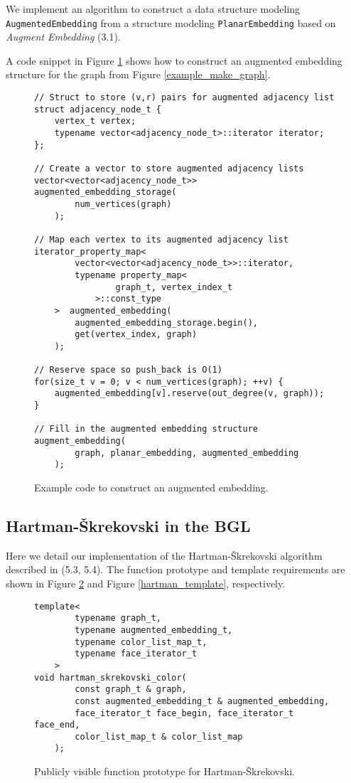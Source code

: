 \documentclass[letterpaper, 12pt]{article}
\theoremstyle{thm}
\begin{document}
We implement an algorithm to construct a data structure modeling
\texttt{Augmented{\allowbreak}Embedding}
from a structure modeling \texttt{PlanarEmbedding} based on \textit{Augment
Embedding} (3.1).

A code snippet in Figure \ref{example_augment_embedding} shows how to
construct an augmented embedding structure for the graph from Figure
\ref{example_make_graph}.

\begin{figure}
\begin{lstlisting}[frame=single]
// Struct to store (v,r) pairs for augmented adjacency list
struct adjacency_node_t {
    vertex_t vertex;
    typename vector<adjacency_node_t>::iterator iterator;
};

// Create a vector to store augmented adjacency lists
vector<vector<adjacency_node_t>> augmented_embedding_storage(
        num_vertices(graph)
    );

// Map each vertex to its augmented adjacency list
iterator_property_map<
        vector<vector<adjacency_node_t>>::iterator,
        typename property_map<
                graph_t, vertex_index_t
            >::const_type
    >  augmented_embedding(
        augmented_embedding_storage.begin(),
        get(vertex_index, graph)
    );

// Reserve space so push_back is O(1)
for(size_t v = 0; v < num_vertices(graph); ++v) {
    augmented_embedding[v].reserve(out_degree(v, graph));
}

// Fill in the augmented embedding structure
augment_embedding(
        graph, planar_embedding, augmented_embedding
    );
\end{lstlisting}
\caption{Example code to construct an augmented embedding.}
\label{example_augment_embedding}
\end{figure}

\subsection{Hartman-\v{S}krekovski in the BGL}

Here we detail our implementation of the Hartman-\v{S}krekovski algorithm described
in (5.3, 5.4). The
function prototype and template requirements are shown
in Figure \ref{hartman_prototype} and Figure \ref{hartman_template},
respectively.

\begin{figure}
\begin{lstlisting}[frame=single]
template<
        typename graph_t,
        typename augmented_embedding_t,
        typename color_list_map_t,
        typename face_iterator_t
    >
void hartman_skrekovski_color(
        const graph_t & graph,
        const augmented_embedding_t & augmented_embedding,
        face_iterator_t face_begin, face_iterator_t face_end,
        color_list_map_t & color_list_map
    );
\end{lstlisting}
\caption{Publicly visible function prototype for Hartman-\v{S}krekovski.}
\label{hartman_prototype}
\end{figure}
\end{document}
